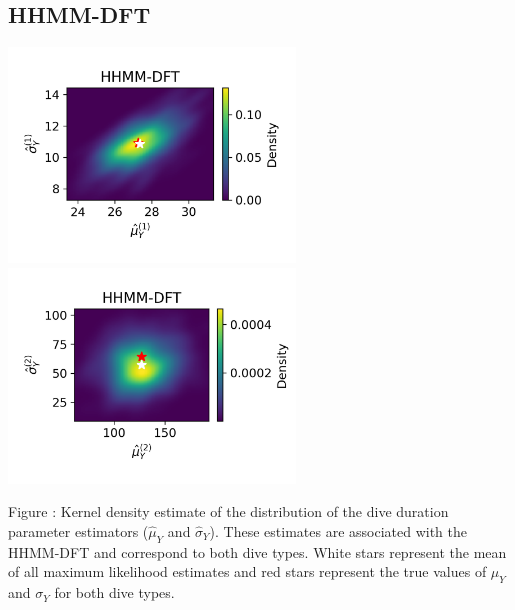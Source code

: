 \documentclass{article}
\begin{document}
        \subsection{HHMM-DFT}
        \begin{center}
        \includegraphics[width=3in]{../Plots/hhmm_FV_uncorr_MLE_density_dive_duration_-1_0.png}
        \includegraphics[width=3in]{../Plots/hhmm_FV_uncorr_MLE_density_dive_duration_-1_1.png}
        \end{center}

        \noindent Figure : Kernel density estimate of the distribution of the dive duration parameter estimators ($\hat \mu_Y$ and $\hat \sigma_Y$). These estimates are associated with the HHMM-DFT and correspond to both dive types. White stars represent the mean of all maximum likelihood estimates and red stars represent the true values of $\mu_Y$ and $\sigma_Y$ for both dive types.
        \addtocounter{fignum}{1}
        
\end{document}
